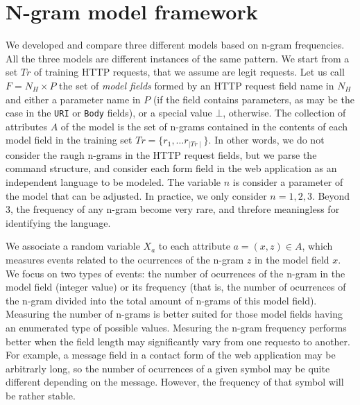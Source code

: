 \documentclass[runningheads,a4paper]{llncs}
\begin{document}
\section{N-gram model framework}

We developed and compare three different models based on n-gram frequencies. All the three models are different instances of the same pattern. We start from a set $Tr$ of training HTTP requests, that we assume are legit requests. Let us call $F=N_H \times P$ the set of \textit{model fields} formed by an HTTP request field name in $N_H$ and either a parameter name in $P$ (if the field contains parameters, as may be the case in the \texttt{URI} or \texttt{Body} fields), or a special value $\bot$, otherwise. The collection of attributes $A$ of the model is the set of n-grams contained in the contents of each model field in the training set $Tr=\{r_1,\ldots r_{\mid Tr \mid}\}$. In other words, we do not consider the raugh n-grams in the HTTP request fields, but we parse the command structure, and consider each form field in the web application as an independent language to be modeled. The variable $n$ is consider a parameter of the model that can be adjusted. In practice, we only consider $n=1,2,3$. Beyond 3, the frequency of any n-gram become very rare, and threfore meaningless for identifying the language.

We associate a random variable $X_a$ to each attribute $a=(x,z) \in A$, which measures events related to the ocurrences of the n-gram $z$ in the model field $x$. We focus on two types of events: the number of ocurrences of the n-gram in the model field (integer value) or its frequency (that is, the number of ocurrences of the n-gram divided into the total amount of n-grams of this model field). Measuring the number of n-grams is better suited for those model fields having an enumerated type of possible values. Mesuring the n-gram frequency performs better when the field length may significantly vary from one requesto to another. For example, a message field in a contact form of the web application may be arbitrarly long, so the number of ocurrences of a given symbol may be quite different depending on the message. However, the frequency of that symbol will be rather stable.

\end{document}
